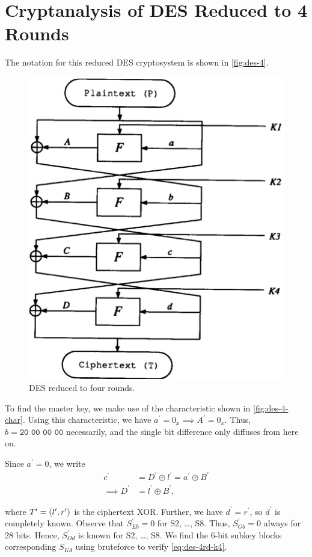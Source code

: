 \documentclass[twoside]{article}
\begin{document}



\section{Cryptanalysis of DES Reduced to 4 Rounds}
The notation for this reduced DES cryptosystem is shown in \autoref{fig:des-4}.

\begin{figure}[!ht]
    \centering
    \includegraphics[width=0.5\linewidth]{images/des_4round.png}
    \caption{DES reduced to four rounds.}
    \label{fig:des-4}
\end{figure}

To find the master key, we make use of the characteristic shown in
\autoref{fig:des-4-char}. Using this characteristic, we have \(a^\prime = 0_x
\implies A^\prime = 0_x\). Thus, \(b = \texttt{20 00 00 00}\) necessarily, and
the single bit difference only diffuses from here on.

Since \(a^\prime = 0\), we write
\begin{align}
    c^\prime &= D^\prime \oplus l^\prime = a^\prime \oplus B^\prime \\
    \implies D^\prime &= l^\prime \oplus B^\prime,
    \label{eq:des-4rd-D}
\end{align}

where \(T^\prime = (l^\prime, r^\prime)\) is the ciphertext XOR. Further,
we have \(d^\prime = r^\prime\), so \(d^\prime\) is completely known. Observe
that \(S^\prime_{Eb} = 0\) for S2, \dots, S8. Thus, \(S^\prime_{Ob} = 0\) always
for 28 bits. Hence, \(S^\prime_{Od}\) is known for S2, \dots, S8. We find the
6-bit subkey blocks corresponding \(S_{Kd}\) using bruteforce to verify
\eqref{eq:des-4rd-k4}. 
\end{document}
